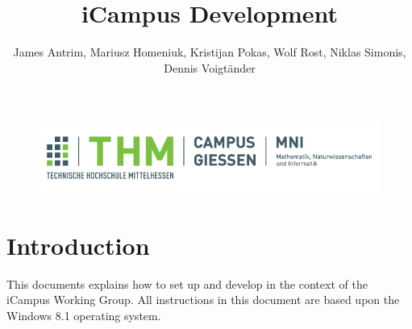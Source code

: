 \documentclass[]{report}
\begin{document}
\title{iCampus Development}
\author{James Antrim, Mariusz Homeniuk, Kristijan Pokas, Wolf Rost, Niklas Simonis, Dennis Voigt\"ander}

\begin{figure}
\includegraphics[width=14cm]{thm.png}
\maketitle
\end{figure}

\newpage
\tableofcontents

\chapter{Introduction}

This documents explains how to set up and develop in the context of the iCampus Working Group. All instructions in this document are based upon the Windows 8.1 operating system.










\end{document}
